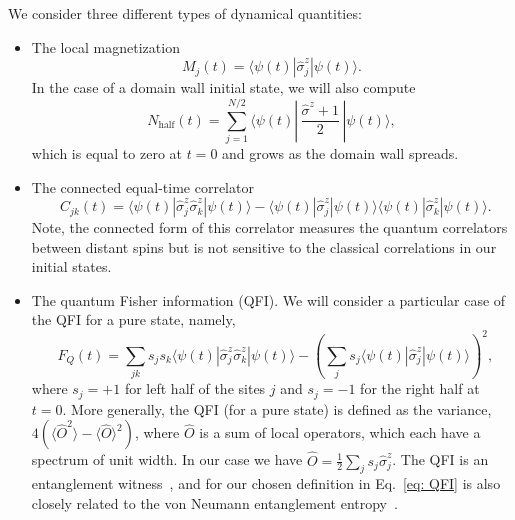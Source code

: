 \documentclass[twocolumn,showpacs,preprintnumbers,nofootinbib,amsmath,aps,pra,longbibliography,amssymb,superscriptaddress]{revtex4-1}
\newcommand{\la}{\langle}
\newcommand{\ra}{\rangle}
\begin{document}
We consider three different types of dynamical quantities:
\begin{itemize}[noitemsep,topsep=3pt,parsep=3pt,partopsep=3pt,leftmargin=10pt]
	\item The local magnetization 
	\begin{equation}
	M_j(t) = \la \psi (t) | \hat{\sigma}^z_j | \psi(t) \ra.
	\end{equation}
 	In the case of a domain wall initial state, we will also compute
	\begin{equation}\label{eq: N half}
	N_\text{half}(t) = \sum_{j=1}^{N/2} \la \psi (t) |\, \frac{\hat{\sigma}^z + 1}{2} \,| \psi(t) \ra,
	\end{equation}
	which is equal to zero at $t=0$ and grows as the domain wall spreads.
	\item The connected equal-time correlator
	\begin{equation}\label{eq: connected correlator}
	\;\; C_{jk}(t) = \la \psi (t) | \hat{\sigma}^z_j\hat{\sigma}^z_k | \psi(t) \ra - \la \psi (t) | \hat{\sigma}^z_j| \psi(t) \ra\la \psi (t) | \hat{\sigma}^z_k | \psi(t) \ra.
	\end{equation}
 	Note, the connected form of this correlator measures the quantum correlators between distant spins but is not sensitive to the classical correlations in our initial states.
	\item The quantum Fisher information (QFI). We will consider a particular case of the QFI for a pure state, namely,
	\begin{equation}\label{eq: QFI}
	\;\; F_Q(t) = \sum_{jk} s_j s_k \la \psi (t) | \hat{\sigma}^z_j\hat{\sigma}^z_k | \psi(t) \ra - \left(\sum_j s_j \la \psi (t) | \hat{\sigma}^z_j | \psi(t) \ra \right)^2,
	\end{equation}
	where $s_j = +1$ for left half of the sites $j$ and $s_j = -1$ for the right half at $t=0$. More generally, the QFI (for a pure state) is defined as the variance, $4\left(\la \hat{O}^2\ra - \la\hat{O}\ra^2\right)$, where $\hat{O}$ is a sum of local operators, which each have a spectrum of unit width. In our case we have $\hat{O} = \frac{1}{2}\sum_j s_j \hat{\sigma}^z_j$. The QFI is an entanglement witness~\cite{Hyllus2012,Toth2012,Hauke2016}, and for our chosen definition in Eq.~\eqref{eq: QFI} is also closely related to the von Neumann entanglement entropy~\cite{Klich2009,Song2011,Song2012}.
\end{itemize}
\end{document}
